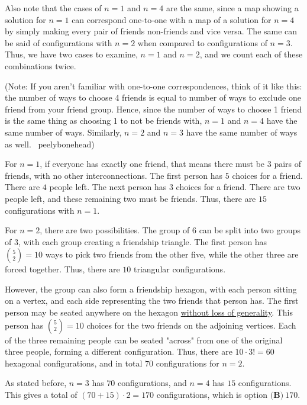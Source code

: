 \begin{enumerate}
 Also note that the cases of $n=1$ and $n=4$ are the same, since a map showing a solution for $n=1$ can correspond one-to-one with a map of a solution for $n=4$ by simply making every pair of friends non-friends and vice versa.  The same can be said of configurations with $n=2$ when compared to configurations of $n=3$.  Thus, we have two cases to examine, $n=1$ and $n=2$, and we count each of these combinations twice.

 (Note: If you aren’t familiar with one-to-one correspondences, think of it like this: the number of ways to choose 4 friends is equal to number of ways to exclude one friend from your friend group. Hence, since the number of ways to choose 1 friend is the same thing as choosing 1 to not be friends with, $n=1$ and $n=4$ have the same number of ways. Similarly, $n=2$ and $n=3$ have the same number of ways as well. ~peelybonehead)

 For $n=1$, if everyone has exactly one friend, that means there must be $3$ pairs of friends, with no other interconnections.  The first person has $5$ choices for a friend.  There are $4$ people left.  The next person has $3$ choices for a friend.  There are two people left, and these remaining two must be friends.  Thus, there are $15$ configurations with $n=1$.

 For $n=2$, there are two possibilities.  The group of $6$ can be split into two groups of $3$, with each group creating a friendship triangle.  The first person has $\binom{5}{2} = 10$ ways to pick two friends from the other five, while the other three are forced together.  Thus, there are $10$ triangular configurations.  

 However, the group can also form a friendship hexagon, with each person sitting on a vertex, and each side representing the two friends that person has.  The first person may be seated anywhere on the hexagon \href{https://artofproblemsolving.com/wiki/index.php?title=Without\_loss\_of\_generality}{without loss of generality}.  This person has $\binom{5}{2} = 10$ choices for the two friends on the adjoining vertices.  Each of the three remaining people can be seated "across" from one of the original three people, forming a different configuration.  Thus, there are $10 \cdot 3! = 60$ hexagonal configurations, and in total $70$ configurations for $n=2$.

 As stated before, $n=3$ has $70$ configurations, and $n=4$ has $15$ configurations.  This gives a total of $(70 + 15)\cdot 2 = 170$ configurations, which is option $\boxed{\textbf{(B)}\ 170}$.


\end{enumerate}
